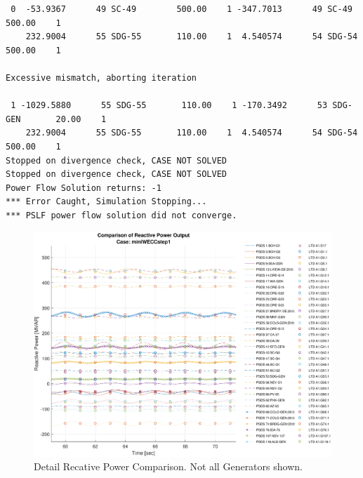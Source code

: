 \documentclass[12pt]{article}
\begin{document}
\begin{Verbatim}
 0  -53.9367      49 SC-49        500.00    1 -347.7013      49 SC-49        500.00    1
    232.9004      55 SDG-55       110.00    1  4.540574      54 SDG-54       500.00    1

Excessive mismatch, aborting iteration

 1 -1029.5880      55 SDG-55       110.00    1 -170.3492      53 SDG-GEN       20.00    1
    232.9004      55 SDG-55       110.00    1  4.540574      54 SDG-54       500.00    1
Stopped on divergence check, CASE NOT SOLVED
Stopped on divergence check, CASE NOT SOLVED
Power Flow Solution returns: -1
*** Error Caught, Simulation Stopping...
*** PSLF power flow solution did not converge.
\end{Verbatim}
\pagebreak
\begin{landscape}
	\begin{figure}[h!]
				\centering
				\includegraphics[width=\linewidth]{manyQ}  \vspace{-2em}
				\caption{Detail Recative Power Comparison. Not all Generators shown.} 
				\label{manyQ}
	\end{figure}\vspace{-2em}
\end{landscape}
\end{document}
